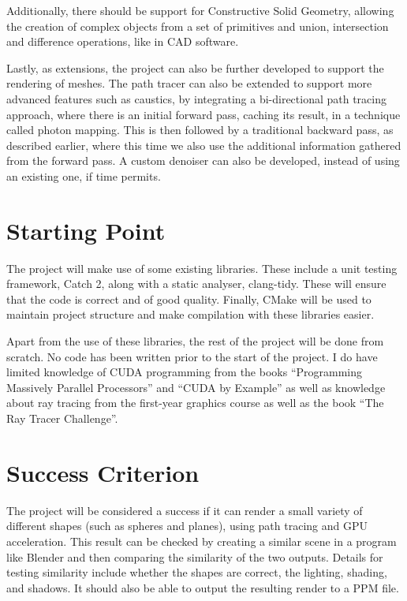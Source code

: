 \documentclass[12pt, a4paper]{article}
\begin{document}
    Additionally, there should be support for Constructive Solid Geometry, allowing the creation of complex objects from a set of primitives and union, intersection and difference operations, like in CAD software.

    Lastly, as extensions, the project can also be further developed to support the rendering of meshes. The path tracer can also be extended to support more advanced features such as caustics, by integrating a bi-directional path tracing approach, where there is an initial forward pass, caching its result, in a technique called photon mapping. This is then followed by a traditional backward pass, as described earlier, where this time we also use the additional information gathered from the forward pass. A custom denoiser can also be developed, instead of using an existing one, if time permits.

    \section*{Starting Point}
    The project will make use of some existing libraries. These include a unit testing framework, Catch 2, along with a static analyser, clang-tidy. These will ensure that the code is correct and of good quality. Finally, CMake will be used to maintain project structure and make compilation with these libraries easier.

    Apart from the use of these libraries, the rest of the project will be done from scratch. No code has been written prior to the start of the project. I do have limited knowledge of CUDA programming from the books “Programming Massively Parallel Processors” and “CUDA by Example” as well as knowledge about ray tracing from the first-year graphics course as well as the book “The Ray Tracer Challenge”.

    \section*{Success Criterion}
    The project will be considered a success if it can render a small variety of different shapes (such as spheres and planes), using path tracing and GPU acceleration. This result can be checked by creating a similar scene in a program like Blender and then comparing the similarity of the two outputs. Details for testing similarity include whether the shapes are correct, the lighting, shading, and shadows. It should also be able to output the resulting render to a PPM file.
\end{document}
